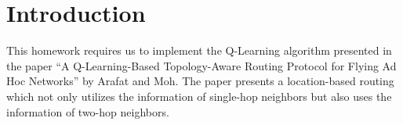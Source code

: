\section{Introduction}
This homework requires us to implement the Q-Learning algorithm presented in the paper ``A Q-Learning-Based Topology-Aware Routing Protocol for Flying Ad Hoc Networks''  by Arafat and Moh.
The paper presents a location-based routing which not only utilizes the information of single-hop neighbors but also uses the information of two-hop neighbors.

